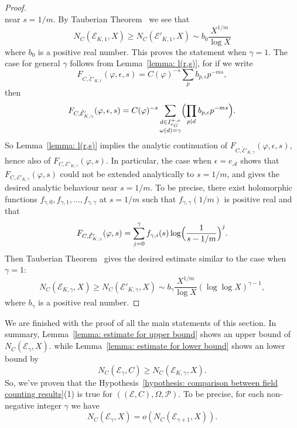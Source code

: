 \documentclass{amsart}
\numberwithin{equation}{section}
\theoremstyle{plain}
\theoremstyle{definition}
\theoremstyle{remark}
\begin{document}
\begin{proof}
\begin{equation*}
	\end{equation*}
	near $s=1/m$.
        By Tauberian Theorem~\cite[Appendix II Theorem I]{narkiewicz2014elementary} we see that
	\begin{equation*}
		N_C(\mathcal{E}_{K,1},X)\geq N_C(\mathcal{E}'_{K,1},X)\sim b_0\frac{X^{1/m}}{\log X}
	\end{equation*}
	where $b_0$ is a positive real number.
	This proves the statement when $\gamma=1$.
	The case for general $\gamma$ follows from Lemma~\ref{lemma: l(r,s)}, for if we write
	\begin{equation*}
		F_{C,\tilde{\mathcal{E}}'_{K,1}}(\varphi,\epsilon,s)=C(\varphi)^{-s}\sum_{p}b_{p,\epsilon}p^{-ms},
	\end{equation*}
	then
	\begin{equation*}
		F_{C,\tilde{\mathcal{E}}'_{K,\gamma}}(\varphi,\epsilon,s)=
		C(\varphi)^{-s}\sum_{
			\substack{
				d\in I^{+,\mu}_{e_G}\\
				\omega(d)=\gamma
			}
		}
        \Bigl(\prod_{p\mid d}b_{p,\epsilon}p^{-ms}\Bigr).
	\end{equation*}
	So Lemma~\ref{lemma: l(r,s)} implies the analytic continuation of $F_{C,\tilde{\mathcal{E}}'_{K,\gamma}}(\varphi,\epsilon,s)$, hence also of $F_{C,\mathcal{E}'_{K,\gamma}}(\varphi,s)$.
    In particular, the case when $\epsilon=e_{\mathcal{A}}$ shows that $F_{C,\mathcal{E}'_{K,\gamma}}(\varphi,s)$ could not be extended analytically to $s=1/m$, and gives the desired analytic behaviour near $s=1/m$.
    To be precise, there exist holomorphic functions $f_{\gamma,0},f_{\gamma,1},\dots,f_{\gamma,\gamma}$ at $s=1/m$ such that $f_{\gamma,\gamma}(1/m)$ is positive real and that
    \begin{equation*}
        F_{C,\tilde{\mathcal{E}}'_{K,\gamma}}(\varphi,s)=\sum_{j=0}^{\gamma}f_{\gamma,i}(s)\log\Bigl(\frac{1}{s-1/m}\Bigr)^{j}.
    \end{equation*}
	Then Tauberian Theorem~\cite[Appendix II Theorem I]{narkiewicz2014elementary} gives the desired estimate similar to the case when $\gamma=1$:
	\begin{equation*}
		N_C(\mathcal{E}_{K,\gamma},X)\geq N_C(\mathcal{E}'_{K,\gamma},X)\sim b_{\gamma}\frac{X^{1/m}}{\log X}(\log\log X)^{\gamma-1},
	\end{equation*}
    where $b_{\gamma}$ is a positive real number.
\end{proof}
We are finished with the proof of all the main statements of this section.
In summary, Lemma~\ref{lemma: estimate for upper bound} shows an upper bound of $N_C(\mathcal{E}_{\gamma},X)$.
while Lemma~\ref{lemma: estimate for lower bound} shows an lower bound by
\begin{equation*}
    N_C(\mathcal{E}_{\gamma},C)\geq N_C(\mathcal{E}_{K,\gamma},X).
\end{equation*}
So, we've proven that the Hypothesis~\ref{hypothesis: comparison between field counting results}(1) is true for $((\mathcal{E},C),\Omega,\mathcal{P})$.
To be precise, for each non-negative integer $\gamma$ we have
\begin{equation*}
    N_C(\mathcal{E}_{\gamma},X)=o(N_C(\mathcal{E}_{\gamma+1},X)).
\end{equation*}
\end{document}
